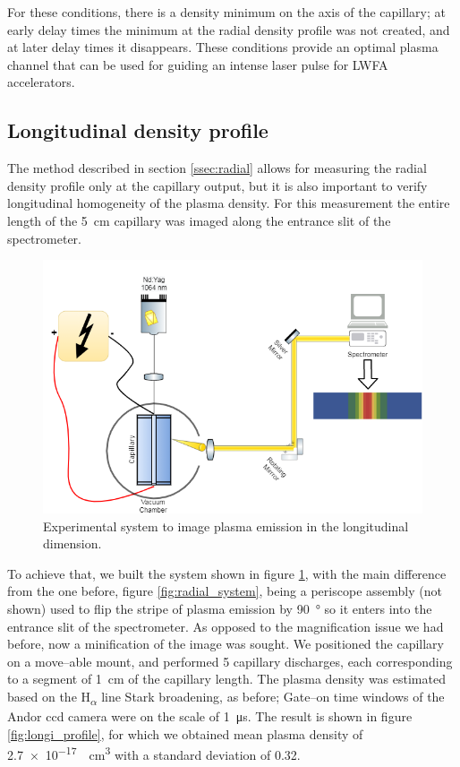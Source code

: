 \documentclass[../main.tex]{subfiles}
\begin{document}
For these conditions, there is a density minimum on the axis of the capillary; at early delay times the minimum at the radial density profile was not created, and at later delay times it disappears. These conditions provide an optimal plasma channel that can be used for guiding an intense laser pulse for LWFA accelerators.

\subsection{Longitudinal density profile}\label{ssec:longi}

The method described in section \ref{ssec:radial} allows for measuring the radial density profile only at the capillary output, but it is also important to verify longitudinal homogeneity of the plasma density. For this measurement the entire length of the \SI{5}{\cm} capillary was imaged along the entrance slit of the spectrometer.
\begin{figure}
    \centering
    \includegraphics[width=\textwidth]{figures/spectro/longitudinal_system.png}
    \caption{Experimental system to image plasma emission in the longitudinal dimension.}
    \label{fig:longi_system}
\end{figure}

To achieve that, we built the system shown in figure \ref{fig:longi_system}, with the main difference from the one before, figure \ref{fig:radial_system}, being a periscope assembly (not shown) used to flip the stripe of plasma emission by \SI{90}{\degree} so it enters into the entrance slit of the spectrometer. As opposed to the magnification issue we had before, now a minification of the image was sought. We positioned the capillary on a move--able mount, and performed 5 capillary discharges, each corresponding to a segment of \SI{1}{\cm} of the capillary length. The plasma density was estimated based on the H\textsubscript{$\alpha$} line Stark broadening, as before; Gate--on time windows of the Andor ccd camera were on the scale of \SI{1}{\us}. The result is shown in figure \ref{fig:longi_profile}, for which we obtained mean plasma density of \SI{2.7e-17}{\per\cubic\cm} with a standard deviation of 0.32.
\end{document}
